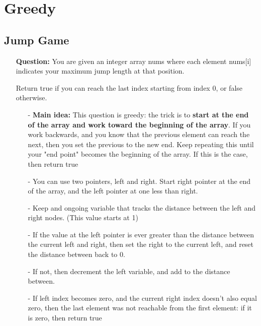 \documentclass[12pt]{article}
\begin{document}
\begin{enumerate}
\begin{enumerate}
    \end{enumerate}
\end{enumerate}








\section{Greedy}
\subsection{Jump Game}
\begin{enumerate}
  \item[] \textbf{Question:}
  You are given an integer array nums where each element nums[i] indicates your maximum jump length at that position.

  Return true if you can reach the last index starting from index 0, or false otherwise.
    \begin{enumerate}
      \item[-] \textbf{Main idea:} This question is greedy: the trick is to \textbf{start at the end of the array and work toward the beginning of the array}. If you work backwards, and you know that the previous element can reach the next, then you set the previous to the new end. Keep repeating this until your "end point" becomes the beginning of the array. If this is the case, then return true
      \item[-] You can use two pointers, left and right. Start right pointer at the end of the array, and the left pointer at one less than right.
      \item[-] Keep and ongoing variable that tracks the distance between the left and right nodes. (This value starts at 1)
      \item[-] If the value at the left pointer is ever greater than the distance between the current left and right, then set the right to the current left, and reset the distance between back to 0. 
      \item[-] If not, then decrement the left variable, and add to the distance between.
      \item[-] If left index becomes zero, and the current right index doesn't also equal zero, then the last element was not reachable from the first element: if it is zero, then return true
    \end{enumerate}
\end{enumerate}
\end{document}
